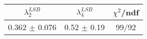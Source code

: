 \begin{tabular}{c|c||c}
$\lambda_{2}^{LSB}$ & $\lambda_4^{LSB}$ & $\chi^{2}$/ndf \\
\hline
0.362 $\pm$ 0.076 & 0.52 $\pm$ 0.19 & 99/92\\
\end{tabular}

